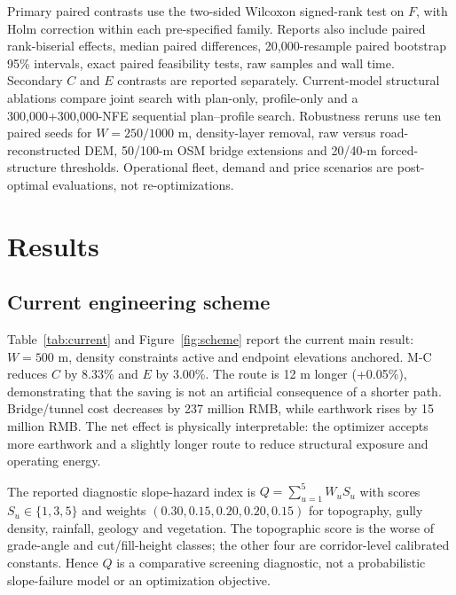 \documentclass[preprint,12pt]{elsarticle}
\begin{document}
Primary paired contrasts use the two-sided Wilcoxon signed-rank test on $F$, with Holm correction within each pre-specified family. Reports also include paired rank-biserial effects, median paired differences, 20,000-resample paired bootstrap 95\% intervals, exact paired feasibility tests, raw samples and wall time. Secondary $C$ and $E$ contrasts are reported separately. Current-model structural ablations compare joint search with plan-only, profile-only and a 300,000+300,000-NFE sequential plan--profile search. Robustness reruns use ten paired seeds for $W=250/1000$ m, density-layer removal, raw versus road-reconstructed DEM, 50/100-m OSM bridge extensions and 20/40-m forced-structure thresholds. Operational fleet, demand and price scenarios are post-optimal evaluations, not re-optimizations.

\section{Results}

\subsection{Current engineering scheme}

Table~\ref{tab:current} and Figure~\ref{fig:scheme} report the current main result: $W=500$ m, density constraints active and endpoint elevations anchored. M-C reduces $C$ by 8.33\% and $E$ by 3.00\%. The route is 12 m longer (+0.05\%), demonstrating that the saving is not an artificial consequence of a shorter path. Bridge/tunnel cost decreases by 237 million RMB, while earthwork rises by 15 million RMB. The net effect is physically interpretable: the optimizer accepts more earthwork and a slightly longer route to reduce structural exposure and operating energy.

The reported diagnostic slope-hazard index is $Q=\sum_{u=1}^{5}W_uS_u$ with scores $S_u\in\{1,3,5\}$ and weights $(0.30,0.15,0.20,0.20,0.15)$ for topography, gully density, rainfall, geology and vegetation. The topographic score is the worse of grade-angle and cut/fill-height classes; the other four are corridor-level calibrated constants. Hence $Q$ is a comparative screening diagnostic, not a probabilistic slope-failure model or an optimization objective.
\end{document}
